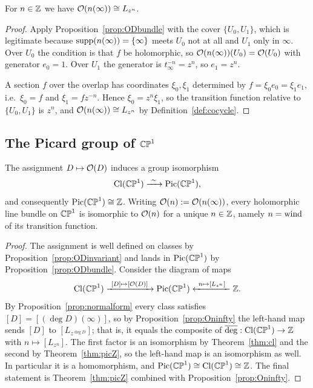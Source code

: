 \begin{smjproposition}\label{prop:Oninfty}
For $n \in \mathbb{Z}$ we have $\mathcal{O}(n(\infty)) \cong L_{z^n}$.
\end{smjproposition}

\begin{proof}
Apply Proposition~\ref{prop:ODbundle} with the cover $\{U_0, U_1\}$, which is
legitimate because $\operatorname{supp}(n(\infty)) = \{\infty\}$ meets $U_0$ not at all and
$U_1$ only in $\infty$. Over $U_0$ the condition is that $f$ be holomorphic, so
$\mathcal{O}(n(\infty))(U_0) = \mathcal{O}(U_0)$ with generator $e_0 = 1$. Over $U_1$ the
generator is $t_\infty^{-n} = z^{n}$, so $e_1 = z^n$.

A section $f$ over the overlap has coordinates $\xi_0, \xi_1$ determined by
$f = \xi_0 e_0 = \xi_1 e_1$, i.e.\ $\xi_0 = f$ and $\xi_1 = f z^{-n}$. Hence
$\xi_0 = z^{n}\xi_1$, so the transition function relative to $\{U_0, U_1\}$ is
$z^{n}$, and $\mathcal{O}(n(\infty)) \cong L_{z^n}$ by Definition~\ref{def:cocycle}.
\end{proof}

\subsection{The Picard group of $\mathbb{CP}^1$}

\begin{theorem}\label{thm:pic}
The assignment $D \mapsto \mathcal{O}(D)$ induces a group isomorphism
\[
\operatorname{Cl}(\mathbb{CP}^1) \xrightarrow{\ \sim\ } \operatorname{Pic}(\mathbb{CP}^1),
\]
and consequently $\operatorname{Pic}(\mathbb{CP}^1) \cong \mathbb{Z}$. Writing $\mathcal{O}(n) := \mathcal{O}(n(\infty))$,
every holomorphic line bundle on $\mathbb{CP}^1$ is isomorphic to $\mathcal{O}(n)$ for a unique
$n \in \mathbb{Z}$, namely $n = \operatorname{wind}$ of its transition function.
\end{theorem}

\begin{proof}
The assignment is well defined on classes by Proposition~\ref{prop:ODinvariant}
and lands in $\operatorname{Pic}(\mathbb{CP}^1)$ by Proposition~\ref{prop:ODbundle}. Consider the
diagram of maps
\[
\Cl(\PP) \xrightarrow{\ [D]\mapsto[\Ostr(D)]\ } \Pic(\PP)
\xleftarrow{\ n \mapsto [L_{z^n}]\ } \ZZ .
\]
By Proposition~\ref{prop:normalform} every class satisfies $[D] =
[(\deg D)(\infty)]$, so by Proposition~\ref{prop:Oninfty} the left-hand map sends
$[D]$ to $[L_{z^{\deg D}}]$; that is, it equals the composite of
$\overline{\deg} : \operatorname{Cl}(\mathbb{CP}^1) \to \mathbb{Z}$ with $n \mapsto [L_{z^n}]$. The first factor
is an isomorphism by Theorem~\ref{thm:cl} and the second by
Theorem~\ref{thm:picZ}, so the left-hand map is an isomorphism as well. In
particular it is a homomorphism, and $\operatorname{Pic}(\mathbb{CP}^1) \cong \operatorname{Cl}(\mathbb{CP}^1) \cong \mathbb{Z}$. The
final statement is Theorem~\ref{thm:picZ} combined with
Proposition~\ref{prop:Oninfty}.
\end{proof}

